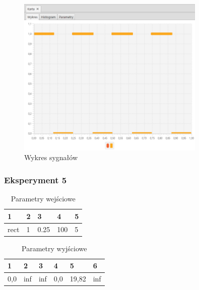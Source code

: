 \documentclass[12pt]{article}
\begin{document}
{{{                \begin{figure}[H]
                    \centering
                    \includegraphics[width=0.8\textwidth]{img/result/experiment5/04/data_draw_sampling_output_quant_output_203951.png}
                    \caption{Wykres sygnałów}
                \end{figure}
            }
            \newpage

            \subsubsection{Eksperyment 5} {
                \begin{table}[H]
                    \centering
                    \begin{tabular}{|l|l|l|l|l|}
                        \hline
                        1 & 2 & 3 & 4 & 5   \\ \hline
                        rect & 1 & 0.25 & 100 & 5  \\ \hline
                    \end{tabular}
                    \caption{Parametry wejściowe}
                \end{table}

                \begin{table}[H]
                    \centering
                    \begin{tabular}{|l|l|l|l|l|l|}
                        \hline
                        1 & 2 & 3 & 4 & 5 & 6  \\ \hline
                        0,0 & inf & inf & 0,0 & 19,82 & inf \\ \hline
                    \end{tabular}
                    \caption{Parametry wyjściowe}
                \end{table}


}}}
\end{document}
